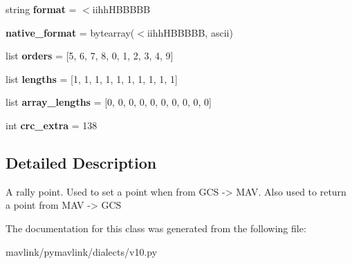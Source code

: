 \begin{DoxyCompactItemize}
\item 
\mbox{\label{classpymavlink_1_1dialects_1_1v10_1_1MAVLink__rally__point__message_abeb4de37db838043a1ac3dcc9ce8b89e}} 
string {\bfseries format} = \textquotesingle{}$<$iihh\+H\+B\+B\+B\+BB\textquotesingle{}
\item 
\mbox{\label{classpymavlink_1_1dialects_1_1v10_1_1MAVLink__rally__point__message_ab883fe4707914d605c22860f20e37f71}} 
{\bfseries native\+\_\+format} = bytearray(\textquotesingle{}$<$iihh\+H\+B\+B\+B\+BB\textquotesingle{}, \textquotesingle{}ascii\textquotesingle{})
\item 
\mbox{\label{classpymavlink_1_1dialects_1_1v10_1_1MAVLink__rally__point__message_a7ff0535d5fc52da2e4bc1936a60e7f22}} 
list {\bfseries orders} = \mbox{[}5, 6, 7, 8, 0, 1, 2, 3, 4, 9\mbox{]}
\item 
\mbox{\label{classpymavlink_1_1dialects_1_1v10_1_1MAVLink__rally__point__message_a62012ab189ed7bc9b290c4e6e8b3d140}} 
list {\bfseries lengths} = \mbox{[}1, 1, 1, 1, 1, 1, 1, 1, 1, 1\mbox{]}
\item 
\mbox{\label{classpymavlink_1_1dialects_1_1v10_1_1MAVLink__rally__point__message_a0e042b69a02a27c356cd12e03dd401b5}} 
list {\bfseries array\+\_\+lengths} = \mbox{[}0, 0, 0, 0, 0, 0, 0, 0, 0, 0\mbox{]}
\item 
\mbox{\label{classpymavlink_1_1dialects_1_1v10_1_1MAVLink__rally__point__message_a0df301fc88bfe42e61faf2702b5f8178}} 
int {\bfseries crc\+\_\+extra} = 138
\end{DoxyCompactItemize}


\subsection{Detailed Description}
\begin{DoxyVerb}A rally point. Used to set a point when from GCS -> MAV. Also
used to return a point from MAV -> GCS
\end{DoxyVerb}
 

The documentation for this class was generated from the following file\+:\begin{DoxyCompactItemize}
\item 
mavlink/pymavlink/dialects/v10.\+py\end{DoxyCompactItemize}
